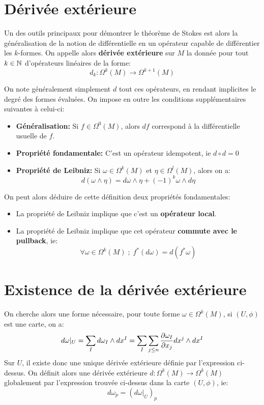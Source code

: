    \section{Dérivée extérieure}
      Un des outils principaux pour démontrer le théorème de Stokes est alors la généralisation de la notion de différentielle en un opérateur capable de différentier les \( k \)-formes. On appelle alors \textbf{dérivée extérieure} sur \( M \) la donnée pour tout \( k \in \mathbb{N} \) d'opérateurs linéaires de la forme:
      \[ 
         d_k : \Omega^k(M) \longrightarrow \Omega^{k+1}(M) 
      \]
      
      On note généralement simplement \( d \) tout ces opérateurs, en rendant implicites le degré des formes évaluées. On impose en outre les conditions supplémentaires suivantes à celui-ci:
      \begin{itemize}
         \item \textbf{Généralisation:} Si \( f \in \Omega^0(M)\), alors \( df \) correspond à la différentielle usuelle de \( f \).
         \item \textbf{Propriété fondamentale:} C'est un opérateur idempotent, ie \(d \circ d = 0\)
         \item \textbf{Propriété de Leibniz:} Si \( \omega \in \Omega^k(M) \) et \( \eta \in \Omega^l(M) \), alors on a:
         \[ 
            d(\omega \wedge \eta) = d\omega \wedge \eta + (-1)^k\omega \wedge d\eta 
         \]
      \end{itemize}
      On peut alors déduire de cette définition deux propriétés fondamentales:
      \begin{itemize}
         \item La propriété de Leibniz implique que c'est un \textbf{opérateur local}.
         \item La propriété de Leibniz implique que cet opérateur \textbf{commute avec le pullback}, ie:
         \[ 
            \forall \omega \in \Omega^k(M) \; ; \; f^*(d\omega) = d(f^*\omega)
         \]
      \end{itemize}
   \section{Existence de la dérivée extérieure}
      On cherche alors une forme nécessaire, pour toute forme \( \omega \in \Omega^k(M) \), si \( (U, \phi) \) est une carte, on a:
      \[ 
         d\omega|_U = \sum_I d\omega_I \wedge dx^I = \sum_I \sum_{j \leq n} \frac{\partial \omega_I}{\partial x_j} dx^j \wedge dx^I
      \]
      Sur \( U \), il existe donc une unique dérivée extérieure définie par l'expression ci-dessus. On définit alors une dérivée extérieure \( d : \Omega^k(M) \longrightarrow \Omega^k(M) \) globalement par l'expression trouvée ci-dessus dans la carte \( (U, \phi) \), ie:
      \[ 
         d\omega_p = (d\omega|_U)_p
      \]
      
